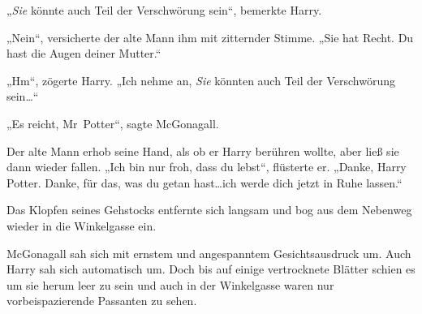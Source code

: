 „\emph{Sie} könnte auch Teil der Verschwörung sein“, bemerkte Harry.

„Nein“, versicherte der alte Mann ihm mit zitternder Stimme. „Sie hat Recht. Du hast die Augen deiner Mutter.“

„Hm“, zögerte Harry. „Ich nehme an, \emph{Sie} könnten auch Teil der Verschwörung sein…“

„Es reicht, Mr~Potter“, sagte McGonagall.

Der alte Mann erhob seine Hand, als ob er Harry berühren wollte, aber ließ sie dann wieder fallen. „Ich bin nur froh, dass du lebst“, flüsterte er. „Danke, Harry Potter. Danke, für das, was du getan hast…ich werde dich jetzt in Ruhe lassen.“

Das Klopfen seines Gehstocks entfernte sich langsam und bog aus dem Nebenweg wieder in die Winkelgasse ein.

McGonagall sah sich mit ernstem und angespanntem Gesichtsausdruck um. Auch Harry sah sich automatisch um. Doch bis auf einige vertrocknete Blätter schien es um sie herum leer zu sein und auch in der Winkelgasse waren nur vorbeispazierende Passanten zu sehen.

